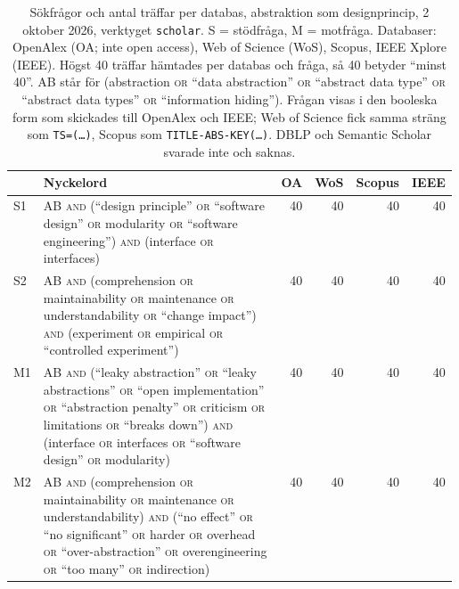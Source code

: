 \begin{table}[!b]
  \centering
  \caption{Sökfrågor och antal träffar per databas, abstraktion som
    designprincip, 2 oktober 2026, verktyget \texttt{scholar}.
    S = stödfråga, M = motfråga.  Databaser: OpenAlex (OA; inte
    \foreignlanguage{english}{open access}), Web of Science (WoS),
    Scopus, IEEE Xplore (IEEE).  Högst 40 träffar hämtades per databas
    och fråga, så 40 betyder \enquote{minst 40}.  AB står för
    (abstraction \textsc{or} \enquote{data abstraction} \textsc{or}
    \enquote{abstract data type} \textsc{or} \enquote{abstract data
    types} \textsc{or} \enquote{information hiding}).  Frågan visas i
    den booleska form som skickades till OpenAlex och IEEE; Web of
    Science fick samma sträng som \texttt{TS=(\dots)}, Scopus som
    \texttt{TITLE-ABS-KEY(\dots)}.  DBLP och Semantic Scholar svarade
    inte och saknas.}
  \label{tab:sok-queries-abstraktion}
  \footnotesize
  \begin{tabular}{@{}lp{0.58\linewidth}rrrr@{}}
    \toprule
    & Nyckelord & OA & WoS & Scopus & IEEE \\
    \midrule
    S1 & AB \textsc{and} (\enquote{design principle} \textsc{or} \enquote{software design} \textsc{or} modularity \textsc{or} \enquote{software engineering}) \textsc{and} (interface \textsc{or} interfaces)
       & 40 & 40 & 40 & 40 \\
    S2 & AB \textsc{and} (comprehension \textsc{or} maintainability \textsc{or} maintenance \textsc{or} understandability \textsc{or} \enquote{change impact}) \textsc{and} (experiment \textsc{or} empirical \textsc{or} \enquote{controlled experiment})
       & 40 & 40 & 40 & 40 \\
    \midrule
    M1 & AB \textsc{and} (\enquote{leaky abstraction} \textsc{or} \enquote{leaky abstractions} \textsc{or} \enquote{open implementation} \textsc{or} \enquote{abstraction penalty} \textsc{or} criticism \textsc{or} limitations \textsc{or} \enquote{breaks down}) \textsc{and} (interface \textsc{or} interfaces \textsc{or} \enquote{software design} \textsc{or} modularity)
       & 40 & 40 & 40 & 40 \\
    M2 & AB \textsc{and} (comprehension \textsc{or} maintainability \textsc{or} maintenance \textsc{or} understandability) \textsc{and} (\enquote{no effect} \textsc{or} \enquote{no significant} \textsc{or} harder \textsc{or} overhead \textsc{or} \enquote{over-abstraction} \textsc{or} overengineering \textsc{or} \enquote{too many} \textsc{or} indirection)
       & 40 & 40 & 40 & 40 \\
    \bottomrule
  \end{tabular}
\end{table}

